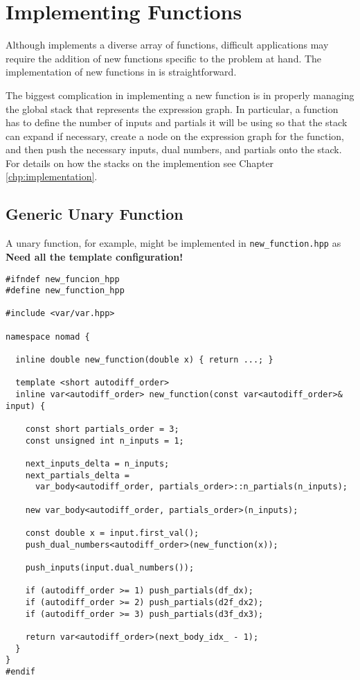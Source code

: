 \section{Implementing Functions}

Although \nomad implements a diverse array of functions, difficult applications
may require the addition of new functions specific to the problem at hand.  The
implementation of new functions in \nomad is straightforward.

The biggest complication in implementing a new function is in properly
managing the global stack that represents the expression graph.  In particular,
a function has to define the number of inputs and partials it will be using
so that the stack can expand if necessary, create a node on the expression
graph for the function, and then push the necessary inputs, dual numbers,
and partials onto the stack.  For details on how the stacks on the implemention
see Chapter \ref{chp:implementation}.

\subsection{Generic Unary Function}

A unary function, for example, might be implemented in \verb|new_function.hpp|
as \textbf{Need all the template configuration!}
%
\begin{verbatim}
#ifndef new_funcion_hpp
#define new_function_hpp

#include <var/var.hpp>

namespace nomad {

  inline double new_function(double x) { return ...; }
  
  template <short autodiff_order>
  inline var<autodiff_order> new_function(const var<autodiff_order>& input) {
    
    const short partials_order = 3;
    const unsigned int n_inputs = 1;
    
    next_inputs_delta = n_inputs;
    next_partials_delta =
      var_body<autodiff_order, partials_order>::n_partials(n_inputs);
    
    new var_body<autodiff_order, partials_order>(n_inputs);

    const double x = input.first_val();
    push_dual_numbers<autodiff_order>(new_function(x));
    
    push_inputs(input.dual_numbers());
    
    if (autodiff_order >= 1) push_partials(df_dx);
    if (autodiff_order >= 2) push_partials(d2f_dx2);
    if (autodiff_order >= 3) push_partials(d3f_dx3);

    return var<autodiff_order>(next_body_idx_ - 1);
  }
}
#endif
\end{verbatim}

